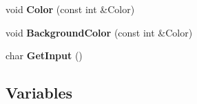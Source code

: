 \begin{DoxyCompactItemize}
\item 
\hypertarget{namespace_chase_game_a3a120300b1e200a26fe8680a33300283}{void {\bfseries Color} (const int \&Color)}\label{namespace_chase_game_a3a120300b1e200a26fe8680a33300283}

\item 
\hypertarget{namespace_chase_game_ad2dbfd93f4fd5725ab396d5dfa78a0c4}{void {\bfseries Background\-Color} (const int \&Color)}\label{namespace_chase_game_ad2dbfd93f4fd5725ab396d5dfa78a0c4}

\item 
\hypertarget{namespace_chase_game_afa8eec677de5433e0e886da19f7e9c4a}{char {\bfseries Get\-Input} ()}\label{namespace_chase_game_afa8eec677de5433e0e886da19f7e9c4a}

\end{DoxyCompactItemize}
\subsection*{Variables}
